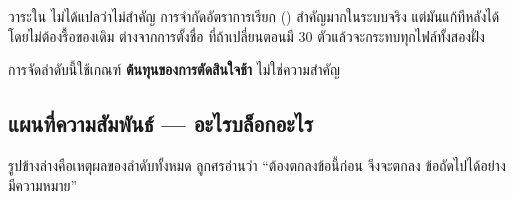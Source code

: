 \begin{warnbox}[title={ทุกวาระสำคัญ --- แต่ไม่ใช่ทุกวาระเร่งด่วน}]
วาระใน \pthree{} ไม่ได้แปลว่าไม่สำคัญ การจำกัดอัตราการเรียก ()
สำคัญมากในระบบจริง แต่มันแก้ทีหลังได้โดยไม่ต้องรื้อของเดิม ต่างจากการตั้งชื่อ
 ที่ถ้าเปลี่ยนตอนมี 30 ตัวแล้วจะกระทบทุกไฟล์ทั้งสองฝั่ง

การจัดลำดับนี้ใช้เกณฑ์ \textbf{ต้นทุนของการตัดสินใจช้า} ไม่ใช่ความสำคัญ
\end{warnbox}

\subsection*{แผนที่ความสัมพันธ์ --- อะไรบล็อกอะไร}

รูปข้างล่างคือเหตุผลของลำดับทั้งหมด ลูกศรอ่านว่า ``ต้องตกลงข้อนี้ก่อน จึงจะตกลง
ข้อถัดไปได้อย่างมีความหมาย''

